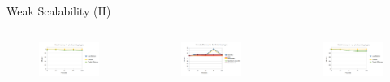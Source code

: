 \documentclass[aspectratio=169]{bredelebeamer}
\begin{document}
\begin{frame}{Weak Scalability (II)}

\begin{columns}

\begin{figure}[h!]
\centering
\includegraphics[width=\textwidth, keepaspectratio=1]{"./img/basic_analysis/modelFactors_distributed"}
\end{figure}

\begin{figure}[h!]
\centering
\includegraphics[width=\textwidth, keepaspectratio=1]{"./img/basic_analysis/overallEfficiency_distributed"}
\end{figure}

\begin{figure}[h!]
\centering
\includegraphics[width=\textwidth, keepaspectratio=1]{"./img/basic_analysis/modelFactors_nonDistributed"}
\end{figure}


\end{columns}
\end{frame}
\end{document}
